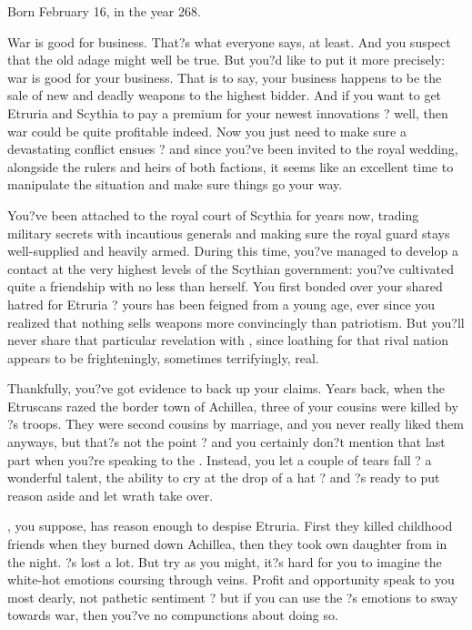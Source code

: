 \documentclass[char]{Kos}
\begin{document}
\name{\cArmsDealer{}}

Born February 16, in the year 268.

War is good for business. That?s what everyone says, at least. And you suspect that the old adage might well be true. But you?d like to put it more precisely: war is good for your business. That is to say, your business happens to be the sale of new and deadly weapons to the highest bidder. And if you want to get Etruria and Scythia to pay a premium for your newest innovations ? well, then war could be quite profitable indeed. Now you just need to make sure a devastating conflict ensues ? and since you?ve been invited to the royal wedding, alongside the rulers and heirs of both factions, it seems like an excellent time to manipulate the situation and make sure things go your way.

You?ve been attached to the royal court of Scythia for years now, trading military secrets with incautious generals and making sure the royal guard stays well-supplied and heavily armed. During this time, you?ve managed to develop a contact at the very highest levels of the Scythian government: you?ve cultivated quite a friendship with no less than \cScythiaQueen{\Monarch} \cScythiaQueen{} herself. You first bonded over your shared hatred for Etruria ? yours has been feigned from a young age, ever since you realized that nothing sells weapons more convincingly than patriotism. But you?ll never share that particular revelation with \cScythiaQueen{}, since \cScythiaQueen{\their} loathing for that rival nation appears to be frighteningly, sometimes terrifyingly, real.

Thankfully, you?ve got evidence to back up your claims. Years back, when the Etruscans razed the border town of Achillea, three of your cousins were killed by \cEtruriaKing{\Monarch} \cEtruriaKing{}?s troops. They were second cousins by marriage, and you never really liked them anyways, but that?s not the point ? and you certainly don?t mention that last part when you?re speaking to the \cScythiaQueen{\Monarch}. Instead, you let a couple of tears fall ? a wonderful talent, the ability to cry at the drop of a hat ? and \cScythiaQueen{}?s ready to put reason aside and let \cScythiaQueen{\their} wrath take over.

\cScythiaQueen{}, you suppose, has reason enough to despise Etruria. First they killed \cScythiaQueen{\their} childhood friends when they burned down Achillea, then they took \cScythiaQueen{\their} own daughter from \cScythiaQueen{\them} in the night. \cScythiaQueen{\They}?s lost a lot. But try as you might, it?s hard for you to imagine the white-hot emotions coursing through \cScythiaQueen{\their} veins. Profit and opportunity speak to you most dearly, not pathetic sentiment ? but if you can use the \cScythiaQueen{\Monarch}?s emotions to sway \cScythiaQueen{\them} towards war, then you?ve no compunctions about doing so.
\end{document}
